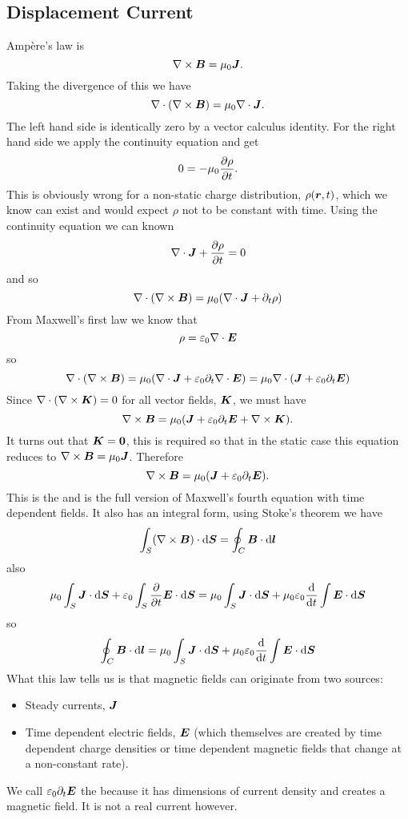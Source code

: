     \subsection{Displacement Current}
    Amp\`ere's law is
    \[\nabla\times\bm{B} = \mu_0\bm{J}.\]
    Taking the divergence of this we have
    \[\nabla\cdot(\nabla\times\bm{B}) = \mu_0\nabla\cdot\bm{J}.\]
    The left hand side is identically zero by a vector calculus identity.
    For the right hand side we apply the continuity equation and get
    \[0 = -\mu_0\pdv{\rho}{t}.\]
    This is obviously wrong for a non-static charge distribution, \(\rho(\bm{r}, t)\), which we know can exist and would expect \(\rho\) not to be constant with time.
    Using the continuity equation we can known
    \[\nabla\cdot\bm{J} + \pdv{\rho}{t} = 0\]
    and so
    \[\nabla\cdot(\nabla\times\bm{B}) = \mu_0(\nabla\cdot\bm{J} + \partial_t\rho)\]
    From Maxwell's first law we know that
    \[\rho = \varepsilon_0\nabla\cdot\bm{E}\]
    so
    \[\nabla\cdot(\nabla\times\bm{B}) = \mu_0(\nabla\cdot\bm{J} + \varepsilon_0\partial_t\nabla\cdot\bm{E}) = \mu_0 \nabla\cdot(\bm{J} + \varepsilon_0\partial_t\bm{E})\]
    Since \(\nabla\cdot(\nabla\times\bm{K}) = 0\) for all vector fields, \(\bm{K}\), we must have
    \[\nabla\times\bm{B} = \mu_0(\bm{J} + \varepsilon_0\partial_t\bm{E} + \nabla\times\bm{K}).\]
    It turns out that \(\bm{K} = \bm{0}\), this is required so that in the static case this equation reduces to \(\nabla\times\bm{B} = \mu_0\bm{J}\).
    Therefore
    \[\nabla\times\bm{B} = \mu_0(\bm{J} + \varepsilon_0\partial_t\bm{E}).\]
    This is the  and is the full version of Maxwell's fourth equation with time dependent fields.
    It also has an integral form, using Stoke's theorem we have
    \[\int_S(\nabla\times\bm{B})\cdot\dd{\bm{S}} = \oint_C \bm{B}\cdot\dd{\bm{l}}\]
    also
    \[\mu_0\int_S \bm{J}\cdot\dd{\bm{S}} + \varepsilon_0\int_S \pdv{t}\bm{E}\cdot\dd{\bm{S}} = \mu_0\int_S \bm{J}\cdot\dd{\bm{S}} + \mu_0\varepsilon_0\dv{t}\int\bm{E}\cdot\dd{\bm{S}}\]
    so
    \[\oint_C\bm{B}\cdot\dd{\bm{l}} = \mu_0\int_S \bm{J}\cdot\dd{\bm{S}} + \mu_0\varepsilon_0\dv{t}\int\bm{E}\cdot\dd{\bm{S}}\]
    What this law tells us is that magnetic fields can originate from two sources:
    \begin{itemize}
        \item Steady currents, \(\bm{J}\)
        \item Time dependent electric fields, \(\bm{E}\) (which themselves are created by time dependent charge densities or time dependent magnetic fields that change at a non-constant rate).
    \end{itemize}
    We call \(\varepsilon_0\partial_{t}\bm{E}\) the  because it has dimensions of current density and creates a magnetic field.
    It is not a real current however.
    
